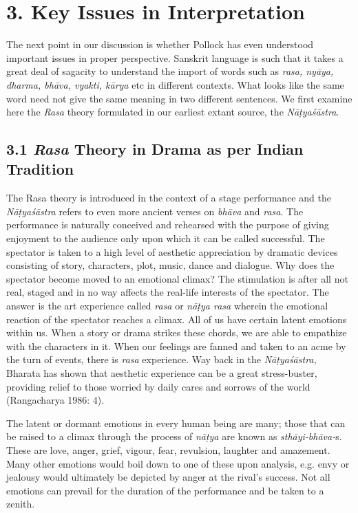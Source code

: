 \vspace{-.3cm}

\section*{3. Key Issues in Interpretation}

The next point in our discussion is whether Pollock has even understood important issues in proper perspective. Sanskrit language is such that it takes a great deal of sagacity to understand the import of words such as \textit{rasa, nyāya, dharma, bhāva, vyakti, kārya} etc in different contexts. What looks like the same word need not give the same meaning in two different sentences. We first examine here the \textit{Rasa} theory formulated in our earliest extant source, the \textit{Nāṭyaśāstra}.

\subsection*{3.1 \textit{Rasa} Theory in Drama as per Indian Tradition}

The Rasa theory is introduced in the context of a stage performance and the \textit{Nāṭyaśāstra }refers to even more ancient verses on \textit{bhāva} and \textit{rasa}. The performance is naturally conceived and rehearsed with the purpose of giving enjoyment to the audience only upon which it can be called successful. The spectator is taken to a high level of aesthetic appreciation by dramatic devices consisting of story, characters, plot, music, dance and dialogue. Why does the spectator become moved to an emotional climax? The stimulation is after all not real, staged and in no way affects the real-life interests of the spectator. The answer is the art experience called \textit{rasa} or \textit{nāṭya rasa} wherein the emotional reaction of the spectator reaches a climax. All of us have certain latent emotions within us. When a story or drama strikes these chords, we are able to empathize with the characters in it. When our feelings are fanned and taken to an acme by the turn of events, there is \textit{rasa} experience. Way back in the \textit{Nāṭyaśāstra,} Bharata has shown that aesthetic experience can be a great stress-buster, providing relief to those worried by daily cares and sorrows of the world (Rangacharya 1986: 4).

The latent or dormant emotions in every human being are many; those that can be raised to a climax through the process of \textit{nāṭya} are known as \textit{sthāyi-bhāva-}s. These are love, anger, grief, vigour, fear, revulsion, laughter and amazement. Many other emotions would boil down to one of these upon analysis, e.g. envy or jealousy would ultimately be depicted by anger at the rival’s success. Not all emotions can prevail for the duration of the performance and be taken to a zenith.

